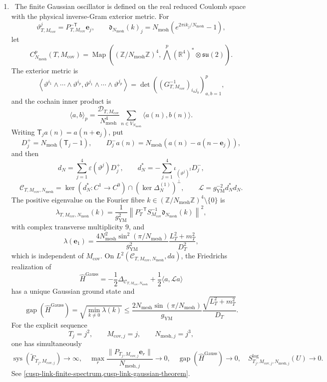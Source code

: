 \begin{enumerate}[leftmargin=1.8em]
\item \Verified\ The finite Gaussian oscillator is defined on the real
reduced Coulomb space with the physical inverse-Gram exterior metric.  For
\[
 \vartheta^j_{T,M_{\mathrm{cov}}}
 =P_{T,M_{\mathrm{cov}}}^{-\mathsf T}\mathbf e_j,\qquad
 \mathfrak d_{N_{\mathrm{mesh}}}(k)_j
 =N_{\mathrm{mesh}}
  (e^{2\pi ik_j/N_{\mathrm{mesh}}}-1),
\]
let
\[
 C^p_{N_{\mathrm{mesh}}}(T,M_{\mathrm{cov}})
 =\operatorname{Map}\!\left(
 (\mathbb Z/N_{\mathrm{mesh}}\mathbb Z)^4,
 \bigwedge^p(\mathbb R^4)^*\otimes\mathfrak{su}(2)\right).
\]
The exterior metric is
\[
 \left\langle
 \vartheta^{i_1}\wedge\cdots\wedge\vartheta^{i_p},
 \vartheta^{j_1}\wedge\cdots\wedge\vartheta^{j_p}
 \right\rangle
 =\det\left((G_{T,M_{\mathrm{cov}}}^{-1})_{i_a j_b}\right)_{a,b=1}^p,
\]
and the cochain inner product is
\[
 \langle a,b\rangle_p
 =\frac{\mathcal D_{T,M_{\mathrm{cov}}}}{N_{\mathrm{mesh}}^4}
 \sum_{n\in V_{N_{\mathrm{mesh}}}}\langle a(n),b(n)\rangle.
\]
Writing \(\mathsf T_ja(n)=a(n+\mathbf e_j)\), put
\[
 D_j^+=N_{\mathrm{mesh}}(\mathsf T_j-1),\qquad
 D_j^-a(n)=N_{\mathrm{mesh}}(a(n)-a(n-\mathbf e_j)),
\]
and then
\[
 d_N=\sum_{j=1}^4\varepsilon(\vartheta^j)D_j^+,\qquad
 d_N^*=-\sum_{j=1}^4\iota_{(\vartheta^j)^\sharp}D_j^-,
\]
\[
 \mathscr C_{T,M_{\mathrm{cov}},N_{\mathrm{mesh}}}
 =\ker(d_N^*:C^1\to C^0)\cap
  (\ker\Delta_N^{(1)})^\perp,\qquad
 \mathcal L=g_{\mathrm{YM}}^{-2}d_N^*d_N.
\]
The positive eigenvalue on the Fourier fibre
\(k\in(\mathbb Z/N_{\mathrm{mesh}}\mathbb Z)^4\setminus\{0\}\) is
\[
 \lambda_{T,M_{\mathrm{cov}},N_{\mathrm{mesh}}}(k)
 =\frac1{g_{\mathrm{YM}}^2}
 \left\lVert P_T^{-\mathsf T}S_{M_{\mathrm{cov}}}^{-1}
 \mathfrak d_{N_{\mathrm{mesh}}}(k)\right\rVert^2,
\]
with complex transverse multiplicity \(9\), and
\[
 \lambda(\mathbf e_1)
 =\frac{4N_{\mathrm{mesh}}^2\sin^2(\pi/N_{\mathrm{mesh}})}
 {g_{\mathrm{YM}}^2}
 \frac{L_T^2+m_T^2}{D_T^2},
\]
which is independent of \(M_{\mathrm{cov}}\).  On
\(L^2(\mathscr C_{T,M_{\mathrm{cov}},N_{\mathrm{mesh}}},da)\), the
Friedrichs realization of
\[
 \widehat H^{\mathrm{Gauss}}
 =-\frac12\Delta_{\mathscr C_{T,M_{\mathrm{cov}},N_{\mathrm{mesh}}}}
  +\frac12\langle a,\mathcal La\rangle
\]
has a unique Gaussian ground state and
\[
 \operatorname{gap}(\widehat H^{\mathrm{Gauss}})
 =\sqrt{\min_{k\ne0}\lambda(k)}
 \le\frac{2N_{\mathrm{mesh}}\sin(\pi/N_{\mathrm{mesh}})}
 {g_{\mathrm{YM}}}\frac{\sqrt{L_T^2+m_T^2}}{D_T}.
\]
For the explicit sequence
\[
 T_j=j^2,\qquad M_{\mathrm{cov},j}=j,\qquad
 N_{\mathrm{mesh},j}=j^3,
\]
one has simultaneously
\[
 \operatorname{sys}(\widetilde F_{T_j,M_{\mathrm{cov},j}})\to\infty,
 \quad
 \max_r\frac{\lVert P_{T_j,M_{\mathrm{cov},j}}\mathbf e_r\rVert}
 {N_{\mathrm{mesh},j}}\to0,
 \quad
 \operatorname{gap}(\widehat H^{\mathrm{Gauss}})\to0,
 \quad
 S^{\log}_{T_j,M_{\mathrm{cov},j},N_{\mathrm{mesh},j}}(U)\to0.
\]
See \cref{cusp-link-finite-spectrum,cusp-link-gaussian-theorem}.


\end{enumerate}
